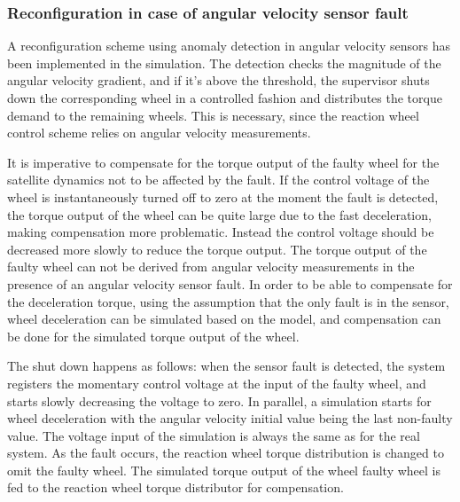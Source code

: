 \subsubsection{Reconfiguration in case of angular velocity sensor fault}

A reconfiguration scheme using anomaly detection in angular velocity sensors has been implemented in the simulation. The detection checks the magnitude of the angular velocity gradient, and if it's above the threshold, the supervisor shuts down the corresponding wheel in a controlled fashion and distributes the torque demand to the remaining wheels. This is necessary, since the reaction wheel control scheme relies on angular velocity measurements. 

It is imperative to compensate for the torque output of the faulty wheel for the satellite dynamics not to be affected by the fault. If the control voltage of the wheel is instantaneously turned off to zero at the moment the fault is detected, the torque output of the wheel can be quite large due to the fast deceleration, making compensation more problematic. Instead the control voltage should be decreased more slowly to reduce the torque output. The torque output of the faulty wheel can not be derived from angular velocity measurements in the presence of an angular velocity sensor fault. In order to be able to compensate for the deceleration torque, using the assumption that the only fault is in the sensor, wheel deceleration can be simulated based on the model, and compensation can be done for the simulated torque output of the wheel.

The shut down happens as follows: when the sensor fault is detected, the system registers the momentary control voltage at the input of the faulty wheel, and starts slowly decreasing the voltage to zero. In parallel, a simulation starts for wheel deceleration with the angular velocity initial value being the last non-faulty value. The voltage input of the simulation is always the same as for the real system. As the fault occurs, the reaction wheel torque distribution is changed to omit the faulty wheel. The simulated torque output of the wheel faulty wheel is fed to the reaction wheel torque distributor for compensation.

